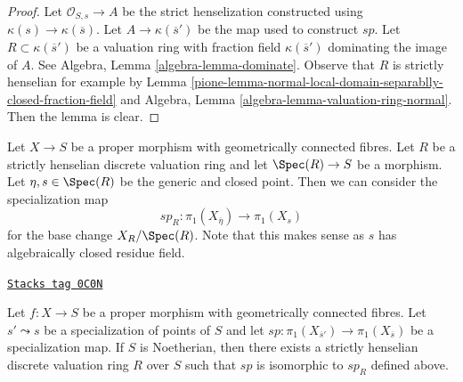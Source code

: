 \begin{proof}

Let $\mathcal{O}_{S, s} \to A$ be the strict henselization
constructed using $\kappa(s) \to \kappa(\overline{s})$.
Let $A \to \kappa(\overline{s}')$ be the map used to construct $sp$.
Let $R \subset \kappa(\overline{s}')$ be a valuation ring with
fraction field $\kappa(\overline{s}')$ dominating the image of $A$.
See Algebra, Lemma \ref{algebra-lemma-dominate}.
Observe that $R$ is strictly henselian for example by
Lemma \ref{pione-lemma-normal-local-domain-separablly-closed-fraction-field}
and Algebra, Lemma \ref{algebra-lemma-valuation-ring-normal}.
Then the lemma is clear.
\end{proof}

Let $X \to S$ be a proper morphism with geometrically connected fibres.
Let $R$ be a strictly henselian discrete valuation ring and let
$\Spec(R) \to S$ be a morphism. Let $\eta, s \in \Spec(R)$ be the
generic and closed point. Then we can consider the specialization map
$$
sp_R : \pi_1(X_{\overline{\eta}}) \to \pi_1(X_s)
$$
for the base change $X_R/\Spec(R)$. Note that this makes sense as $s$
has algebraically closed residue field.

\begin{lemma}
\label{pione-lemma-specialization-map-discrete-valuation-ring}
\href{https://stacks.math.columbia.edu/tag/0C0N}{\texttt{Stacks tag 0C0N}}

Let $f : X \to S$ be a proper morphism with geometrically connected fibres.
Let $s' \leadsto s$ be a specialization of points of $S$ and let
$sp : \pi_1(X_{\overline{s}'}) \to \pi_1(X_{\overline{s}})$
be a specialization map. If $S$ is Noetherian, then
there exists a strictly henselian
discrete valuation ring $R$ over $S$ such that $sp$ is isomorphic to $sp_R$
defined above.
\end{lemma}

